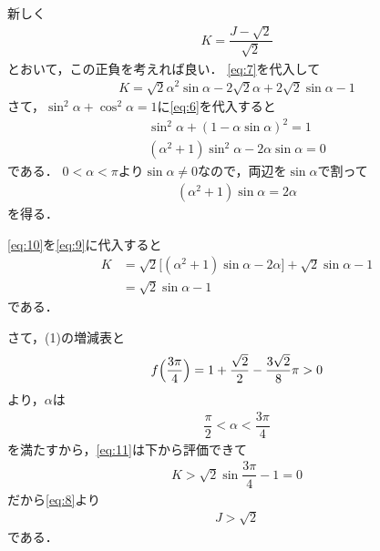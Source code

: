 \documentclass[../../main.tex]{subfiles}
\begin{document}
新しく
\begin{align}
  K=\dfrac{J-\sqrt{2}}{\sqrt{2}} \label{eq:8}
\end{align}
とおいて，この正負を考えれば良い．
\cref{eq:7}を代入して
\begin{align}
  K =\sqrt{2}\alpha^2\sin\alpha-2\sqrt{2}\alpha+2\sqrt{2}\sin\alpha-1 \label{eq:9}
\end{align}
さて，$\sin^2\alpha+\cos^2\alpha=1$に\cref{eq:6}を代入すると
\begin{align}
  \sin^2\alpha+(1-\alpha\sin\alpha)^2=1 \\
  (\alpha^2+1)\sin^2\alpha-2\alpha\sin\alpha=0
\end{align}
である．
$0<\alpha<\pi$より$\sin\alpha\neq0$なので，両辺を$\sin\alpha$で割って
\begin{align}
  (\alpha^2+1)\sin\alpha=2\alpha \label{eq:10}
\end{align}
を得る．

\cref{eq:10}を\cref{eq:9}に代入すると
\begin{align}
  K
  &=\sqrt{2}\bigl[(\alpha^2+1)\sin\alpha-2\alpha\bigr]+\sqrt{2}\sin\alpha-1 \\
  &=\sqrt{2}\sin\alpha-1 \label{eq:11}
\end{align}
である．

さて，(1)の増減表と
\begin{align}
  f\Bigl(\dfrac{3\pi}{4}\Bigr)=1+\dfrac{\sqrt{2}}{2}-\dfrac{3\sqrt{2}}{8}\pi>0
\end{align}
より，$\alpha$は
\begin{align}
  \dfrac{\pi}{2} < \alpha < \dfrac{3\pi}{4}
\end{align}
を満たすから，\cref{eq:11}は下から評価できて
\begin{align}
  K > \sqrt{2}\sin\dfrac{3\pi}{4} - 1  = 0
\end{align}
だから\cref{eq:8}より
\begin{align}
  J > \sqrt{2}
\end{align}
である．

\newpage
\end{document}
